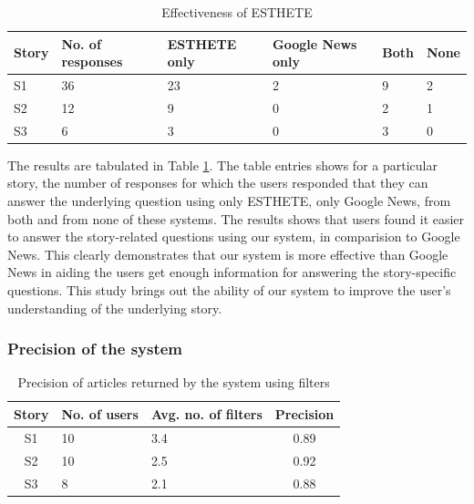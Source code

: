 \begin{table}
\small
\begin{center}
\begin{tabular}{|l|p{1.00cm}|p{1.45cm}|p{1.00cm}|p{1.00cm}|p{1.00cm}|}
\hline
{\bf Story} & {\bf No. of responses} & {\bf ESTHETE only} & {\bf Google News only} & {\bf Both} &{\bf None}\\
\hline
S1 & 36 & 23 & 2 & 9 & 2\\
S2 & 12 & 9 & 0 & 2 & 1\\
S3 & 6 & 3 & 0 & 3 & 0 \\
\hline
\end{tabular}
\end{center}
\caption{Effectiveness of ESTHETE}
\label{tab:effectiveness}
\end{table}
\normalsize
The results are tabulated in Table \ref{tab:effectiveness}. The table entries shows for a particular story, the number of responses for which the users responded that they can answer the underlying question using only ESTHETE, only Google News, from both and from none of these systems. The results shows that users found it easier to answer the story-related questions using our system, in comparision to Google News. This clearly demonstrates that our system is more effective than Google News in aiding the users get enough information for answering the story-specific questions. This study brings out the ability of our system to improve the user's understanding of the underlying story.  


\subsubsection{Precision of the system}

\begin{table}
\begin{center}
\small
\begin{tabular}{|c|p{1.25cm}|p{1.25cm}|c|}
\hline
{\bf Story} & {\bf No. of users} & {\bf Avg. no. of filters} & {\bf Precision}\\
\hline
S1 & 10 & 3.4 & 0.89\\
S2 & 10 & 2.5 & 0.92\\
S3 & 8 & 2.1 & 0.88\\
\hline
\end{tabular}
\end{center}
\caption{Precision of articles returned by the system using filters}
\label{tab:prec}
\end{table}

